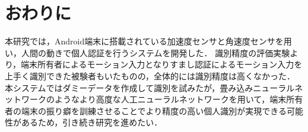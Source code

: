 \section{おわりに}
本研究では，Android端末に搭載されている加速度センサと角速度センサを用い，人間の動きで個人認証を行うシステムを開発した．
識別精度の評価実験より，端末所有者によるモーション入力となりすまし認証によるモーション入力を上手く識別できた被験者もいたものの，全体的には識別精度は高くなかった．
本システムではダミーデータを作成して識別を試みたが，畳み込みニューラルネットワークのようなより高度な人工ニューラルネットワークを用いて，端末所有者の端末の振り癖を訓練させることでより精度の高い個人識別が実現できる可能性があるため，引き続き研究を進めたい．
